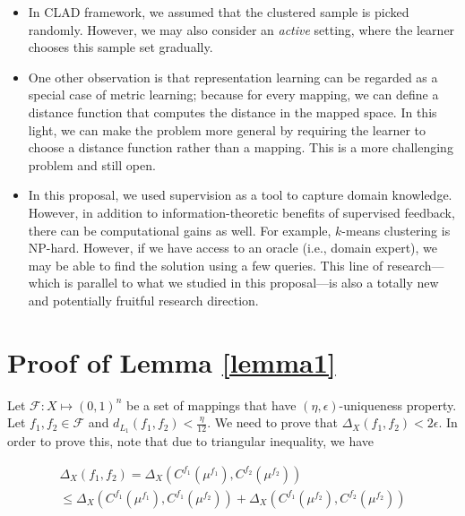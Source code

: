 \documentclass[letterpaper,12pt,titlepage,oneside,final]{book}
\begin{document}
\begin{itemize}
\item In CLAD framework, we assumed that the clustered sample is picked randomly. However, we may also consider an \textit{active} setting, where the learner chooses this sample set gradually.


\item One other observation is that representation learning can be regarded as a special case of metric learning; because for every mapping, we can define a distance function that computes the distance in the mapped space. In this light, we can make the problem more general by requiring the learner to choose a distance function rather than a mapping. This is a more challenging problem and still open.


\item In this proposal, we used supervision as a tool to capture domain knowledge. However, in addition to information-theoretic benefits of supervised feedback, there can be computational gains as well. For example, $k$-means clustering is NP-hard. However, if we have access to an oracle (i.e., domain expert), we may be able to find the solution using a few queries. This line of research---which is parallel to what we studied in this proposal---is also a totally new and potentially fruitful research direction.

\end{itemize}













\appendix

\chapter{Proof of Lemma \ref{lemma1}}

Let $\mathcal{F}:X\mapsto (0,1)^n$ be a set of mappings that have $(\eta, \epsilon)$-uniqueness property. Let $f_1,f_2\in \mathcal{F}$ and $d_{L_1}(f_1,f_2) < \frac{\eta}{12}$. We need to prove that $\Delta_X(f_1, f_2) < 2\epsilon$. In order to prove this, note that due to triangular inequality, we have

\begin{multline}
\Delta_X(f_1, f_2) = \Delta_X(C^{f_1}(\mu^{f_1}), C^{f_2}(\mu^{f_2})) \\
\leq \Delta_X(C^{f_1}(\mu^{f_1}), C^{f_1}(\mu^{f_2})) + \Delta_X(C^{f_1}(\mu^{f_2}), C^{f_2}(\mu^{f_2}))
\end{multline}
\end{document}

